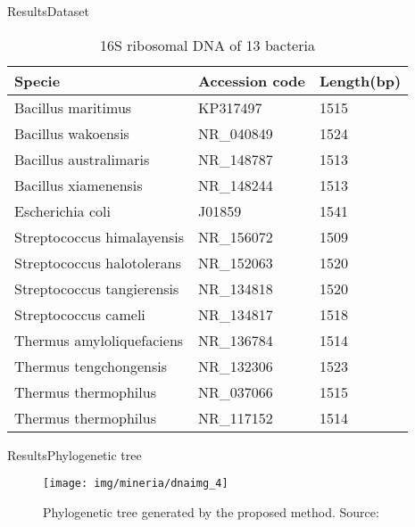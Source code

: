 \documentclass[10pt]{beamer}
\newcommand{\1}{
	\setbeamertemplate{background}{
		\texttt{[image: img/1\_dna]}
		\tikz[overlay] \fill[fill opacity=0.75,fill=white] (0,0) rectangle (-\paperwidth,\paperheight);
	}
}
\begin{document}
\begin{frame}{Results}{Dataset}
	\begin{table}[]
		\caption{16S ribosomal DNA of 13 bacteria}
		\begin{tabular}{lll}
			\textbf{Specie}                     & \textbf{Accession code} & \textbf{Length(bp) } \\
			\hline
			Bacillus maritimus         & KP317497       & 1515       \\
			Bacillus wakoensis         & NR\_040849     & 1524       \\
			Bacillus australimaris     & NR\_148787     & 1513       \\
			Bacillus xiamenensis       & NR\_148244     & 1513       \\
			Escherichia coli           & J01859         & 1541       \\
			Streptococcus himalayensis & NR\_156072     & 1509       \\
			Streptococcus halotolerans & NR\_152063     & 1520       \\
			Streptococcus tangierensis & NR\_134818     & 1520       \\
			Streptococcus cameli       & NR\_134817     & 1518       \\
			Thermus amyloliquefaciens  & NR\_136784     & 1514       \\
			Thermus tengchongensis     & NR\_132306     & 1523       \\
			Thermus thermophilus       & NR\_037066     & 1515       \\
			Thermus thermophilus       & NR\_117152     & 1514      \\
			\hline
		\end{tabular}
	\end{table}
\end{frame}

\begin{frame}{Results}{Phylogenetic tree}
\begin{figure}[]
	\centering
	\texttt{[image: img/mineria/dnaimg\_4]}
	\label{img:mot2}
	\caption{Phylogenetic tree generated by the proposed method. Source: \cite{delibacs2020dna} }
\end{figure}	
\end{frame}
\end{document}

